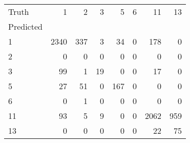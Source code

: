 \begin{tabular}{lrrrrrrr}
\toprule
Truth & 1 & 2 & 3 & 5 & 6 & 11 & 13 \\
Predicted &  &  &  &  &  &  &  \\
\midrule
1 & 2340 & 337 & 3 & 34 & 0 & 178 & 0 \\
2 & 0 & 0 & 0 & 0 & 0 & 0 & 0 \\
3 & 99 & 1 & 19 & 0 & 0 & 17 & 0 \\
5 & 27 & 51 & 0 & 167 & 0 & 0 & 0 \\
6 & 0 & 1 & 0 & 0 & 0 & 0 & 0 \\
11 & 93 & 5 & 9 & 0 & 0 & 2062 & 959 \\
13 & 0 & 0 & 0 & 0 & 0 & 22 & 75 \\
\bottomrule
\end{tabular}
